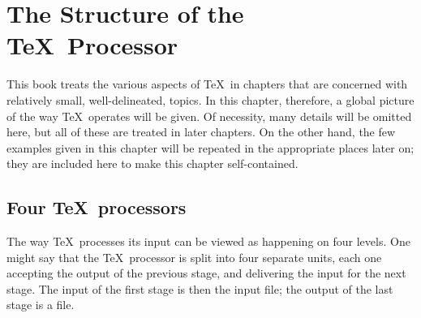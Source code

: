 \documentclass{book}
\begin{document}
\chapter{The Structure of the \TeX\ Processor}

This book treats the various aspects of \TeX\ in chapters
that are concerned with relatively small, well-delineated,
topics. In this chapter, therefore, 
a global picture of the way \TeX\ operates will be given.
Of necessity, many details will be omitted here, but all of
these are treated in later chapters. On the other hand,
the few examples given in this chapter will be repeated
in the appropriate places later on; they are included here
to make this chapter self-contained.

\section{Four \TeX\protect\ processors}

The way \TeX\ processes its input can be viewed as
happening on four levels. One might  say that
the \TeX\ processor is split into four separate units,
each one accepting the output of the previous stage, and
delivering the input for the next stage. The input of
the first stage is then the  input file; the output
of the last stage is a  file.
\end{document}
